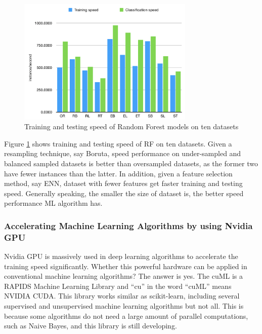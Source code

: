 \begin{figure}
  \includegraphics[width=0.75\textwidth]
  {training speed rf.png}
\caption{Training and testing speed of Random Forest models on ten datasets}
\label{fig: Training speed rf}       %
\end{figure}

Figure \ref{fig: Training speed rf} shows training and testing speed of RF on ten datasets. Given a resampling technique, say Boruta, speed performance on under-sampled and balanced sampled datasets is better than oversampled datasets, as the former two have fewer instances than the latter. In addition, given a feature selection method, say ENN, dataset with fewer features get faster training and testing speed. Generally speaking, the smaller the size of dataset is, the better speed performance ML algorithm has.

\subsubsection{Accelerating Machine Learning Algorithms by using Nvidia GPU}
Nvidia GPU is massively used in deep learning algorithms to accelerate the training speed significantly. Whether this powerful hardware can be applied in conventional machine learning algorithms? The answer is yes. The cuML is a RAPIDS Machine Learning Library and “cu” in the word “cuML” means NVIDIA CUDA. This library works similar as scikit-learn, including several supervised and unsupervised machine learning algorithms but not all. This is because some algorithms do not need a large amount of parallel computations, such as Naive Bayes, and this library is still developing.

